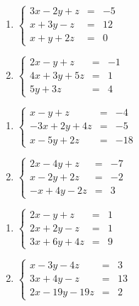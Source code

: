 \begin{multicols}{2}
\begin{enumerate}
\setcounter{enumi}{\value{HW}}


\item $\left\{ \begin{array}{rcr} 3x-2y+z & = & -5 \\ x+3y-z & = & 12 \\ x+y+2z & = & 0  \end{array} \right.$
\item $\left\{ \begin{array}{rcr} 2x-y+z& = & -1 \\ 4x+3y+5z & = & 1 \\  5y+3z & = & 4 \end{array} \right.$

\setcounter{HW}{\value{enumi}}
\end{enumerate}
\end{multicols}


\begin{multicols}{2}
\begin{enumerate}
\setcounter{enumi}{\value{HW}}


\item $\left\{ \begin{array}{rcr} x-y+z & = & -4 \\ -3x+2y+4z & = & -5 \\ x-5y+2z & = & -18  \end{array} \right.$
\item $\left\{ \begin{array}{rcr} 2x-4y+z & = & -7 \\ x-2y+2z & = & -2 \\ -x+4y-2z & = & 3  \end{array} \right.$

\setcounter{HW}{\value{enumi}}
\end{enumerate}
\end{multicols}


\begin{multicols}{2}
\begin{enumerate}
\setcounter{enumi}{\value{HW}}


\item $\left\{ \begin{array}{rcr} 2x-y+z & = & 1 \\ 2x+2y-z & = & 1 \\ 3x+6y+4z & = & 9  \end{array} \right.$
\item $\left\{ \begin{array}{rcr} x-3y-4z & = & 3 \\ 3x+4y-z & = & 13 \\ 2x-19y-19z & = & 2  \end{array} \right.$

\setcounter{HW}{\value{enumi}}
\end{enumerate}
\end{multicols}


